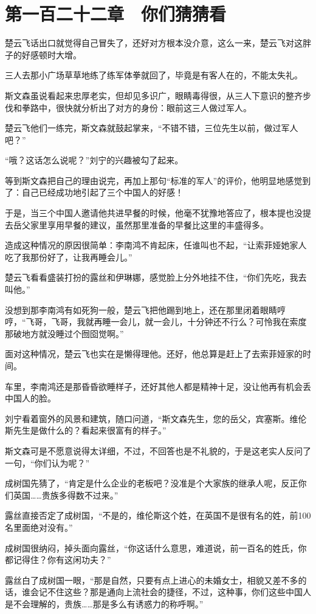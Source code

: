 \section{第一百二十二章　你们猜猜看}

楚云飞话出口就觉得自己冒失了，还好对方根本没介意，这么一来，楚云飞对这胖子的好感顿时大增。

三人去那小广场草草地练了练军体拳就回了，毕竟是有客人在的，不能太失礼。

斯文森虽说看起来忠厚老实，但却见多识广，眼睛毒得很，从三人下意识的整齐步伐和拳路中，很快就分析出了对方的身份：眼前这三人做过军人。

楚云飞他们一练完，斯文森就鼓起掌来，“不错不错，三位先生以前，做过军人吧？”

“哦？这话怎么说呢？”刘宁的兴趣被勾了起来。

等到斯文森把自己的理由说完，再加上那句“标准的军人”的评价，他明显地感觉到了：自己已经成功地引起了三个中国人的好感！

于是，当三个中国人邀请他共进早餐的时候，他毫不犹豫地答应了，根本提也没提去岳父家里享用早餐的建议，虽然那里准备的早餐比这里的丰盛得多。

造成这种情况的原因很简单：李南鸿不肯起床，任谁叫也不起，“让索菲娅她家人吃了我那份好了，让我再睡会儿。”

楚云飞看看盛装打扮的露丝和伊琳娜，感觉脸上分外地挂不住，“你们先吃，我去叫他。”

没想到那李南鸿有如死狗一般，楚云飞把他踢到地上，还在那里闭着眼睛哼哼，“飞哥，飞哥，我就再睡一会儿，就一会儿，十分钟还不行么？可怜我在索度那破地方就没睡过个囫囵觉啊。”

面对这种情况，楚云飞也实在是懒得理他。还好，他总算是赶上了去索菲娅家的时间。

车里，李南鸿还是那昏昏欲睡样子，还好其他人都是精神十足，没让他再有机会丢中国人的脸。

刘宁看着窗外的风景和建筑，随口问道，“斯文森先生，您的岳父，宾塞斯。维伦斯先生是做什么的？看起来很富有的样子。”

斯文森可是不愿意说得太详细，不过，不回答也是不礼貌的，于是这老实人反问了一句，“你们认为呢？”

成树国先猜了，“肯定是什么企业的老板吧？没准是个大家族的继承人呢，反正你们英国……贵族多得数不过来。”

露丝直接否定了成树国，“不是的，维伦斯这个姓，在英国不是很有名的姓，前100名里面绝对没有。”

成树国很纳闷，掉头面向露丝，“你这话什么意思，难道说，前一百名的姓氏，你都记得住？你有这闲功夫？”

露丝白了成树国一眼，“那是自然，只要有点上进心的未婚女士，相貌又差不多的话，谁会记不住这些？那是通向上流社会的捷径，不过，这种事，你们这些中国人是不会理解的，贵族……那是多么有诱惑力的称呼啊。”

